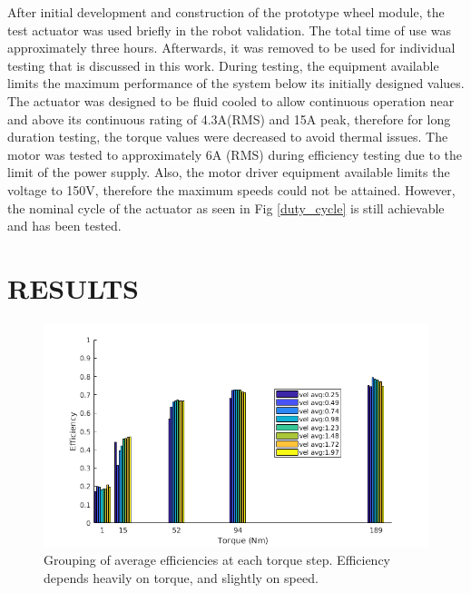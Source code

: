 \documentclass[letterpaper, 10 pt, conference]{ieeeconf}  %
\begin{document}
After initial development and construction of the prototype wheel module, the test actuator was used briefly in the robot validation. The total time of use was approximately three hours. Afterwards, it was removed to be used for individual testing that is discussed in this work. During testing, the equipment available limits the maximum performance of the system below its initially designed values. The actuator was designed to be fluid cooled to allow continuous operation near and above its continuous rating of 4.3A(RMS) and 15A peak, therefore for long duration testing, the torque values were decreased to avoid thermal issues. The motor was tested to approximately 6A (RMS) during efficiency testing due to the limit of the power supply. Also, the motor driver equipment available limits the voltage to 150V, therefore the maximum speeds could not be attained. However, the nominal cycle of the actuator as seen in Fig \ref{duty_cycle} is still achievable and has been tested. 

\section{RESULTS} \label{results}

   \begin{figure}[!b]
      \centering
      \includegraphics[width=\linewidth]{eff_test_bar_plot_v2}
      \caption{Grouping of average efficiencies at each torque step. Efficiency depends heavily on torque, and slightly on speed.}
      \label{eff_results}
   \end{figure}
      
\end{document}
